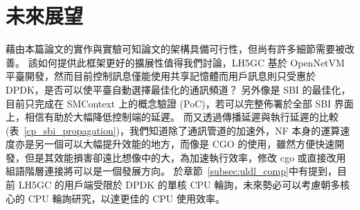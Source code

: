 \chapter{未來展望}
\label{chapter:future}

藉由本篇論文的實作與實驗可知論文的架構具備可行性，但尚有許多細節需要被改善。
該如何提供此框架更好的擴展性值得我們討論，LH5GC 基於 OpenNetVM 平臺開發，然而目前控制訊息僅能使用共享記憶體而用戶訊息則只受惠於 DPDK，是否可以使平臺自動選擇最佳化的通訊頻道？
另外像是 SBI 的最佳化，目前只完成在 SMContext 上的概念驗證 (PoC)，若可以完整佈署於全部 SBI 界面上，相信有助於大幅降低控制端的延遲。
而又透過傳播延遲與執行延遲的比較 (表~\ref{cp_sbi_propagation})，我們知道除了通訊管道的加速外，NF 本身的運算速度亦是另一個可以大幅提升效能的地方，而像是 CGO 的使用，雖然方便快速開發，但是其效能損害卻遠比想像中的大\cite{cgo_not_go}，為加速執行效率，修改 cgo 或直接改用組語階層連接將可以是一個發展方向。
於章節~\ref{subsec:uldl_comp}中有提到，目前 LH5GC 的用戶端受限於 DPDK 的單核 CPU 輪詢，未來勢必可以考慮朝多核心的 CPU 輪詢研究，以達更佳的 CPU 使用效率。
